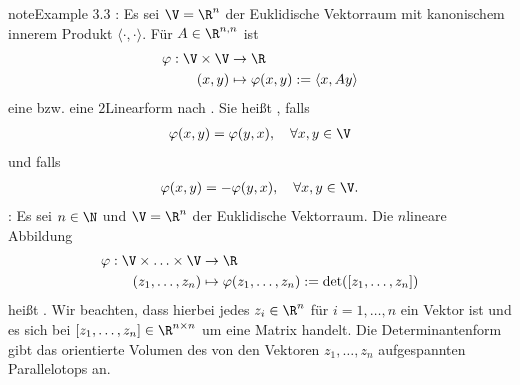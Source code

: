 \documentclass[letterpaper,10pt,german]{jupyterBook}
\begin{document}
\begin{sphinxadmonition}{note}{Example 3.3}
\sphinxAtStartPar
{}: Es sei \(\V=\R^n\) der Euklidische Vektorraum mit kanonischem innerem Produkt \(\langle\cdot,\cdot\rangle\).
Für \(A\in\R^{n,n}\) ist
\begin{equation*}
\begin{split}\varphi:\V\times \V &\to\R\\ 
(x,y) &\mapsto \varphi(x, y) :=\langle x,A y \rangle\end{split}
\end{equation*}
\sphinxAtStartPar
eine  bzw. eine \(2\)\sphinxhyphen{}Linearform nach {\hyperref[\detokenize{vektoranalysis/multilinear:def:multilinear}]{}}.
Sie heißt , falls
\begin{equation*}
\begin{split}\varphi(x, y) = \varphi(y, x), \quad \forall x, y\in \V\end{split}
\end{equation*}
\sphinxAtStartPar
und  falls
\begin{equation*}
\begin{split}\varphi(x, y) = -\varphi(y, x), \quad \forall x, y\in \V.\end{split}
\end{equation*}
\sphinxAtStartPar
{}: Es sei \(n\in \N\) und \(\V=\R^n\) der Euklidische Vektorraum.
Die \(n\)\sphinxhyphen{}lineare Abbildung
\begin{equation*}
\begin{split}\varphi :\V \times \ldots \times \V &\to\R\\ 
(z_1, \ldots, z_n) &\mapsto \varphi(z_1,\ldots,z_n) := \det([z_1,\ldots,z_n])\end{split}
\end{equation*}
\sphinxAtStartPar
heißt .
Wir beachten, dass hierbei jedes \(z_i \in \R^n\) für \(i=1,\ldots,n\) ein Vektor ist und es sich bei \([z_1,\ldots,z_n] \in \R^{n\times n}\) um eine Matrix handelt.
Die Determinantenform gibt das orientierte Volumen des von den Vektoren \(z_1,\ldots,z_n\) aufgespannten Parallelotops an.
\end{sphinxadmonition}
\end{document}

